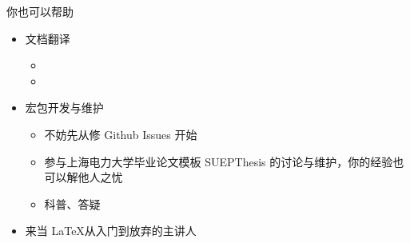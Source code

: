\begin{frame}{你也可以帮助}

  \begin{itemize}
    \item<+-> 文档翻译
  
      \begin{itemize}
        \item {} 
        \item {} 
      \end{itemize}
  
    \item<+-> 宏包开发与维护
  
      \begin{itemize}
        \item 不妨先从修 Github Issues 开始
        \item 参与上海电力大学毕业论文模板 SUEPThesis  的讨论与维护，你的经验也可以解他人之忧
        \item 科普、答疑
      \end{itemize}
  
    \item<+-> \alert{来当 \LaTeX{}从入门到放弃的主讲人}
  \end{itemize}
\end{frame}



